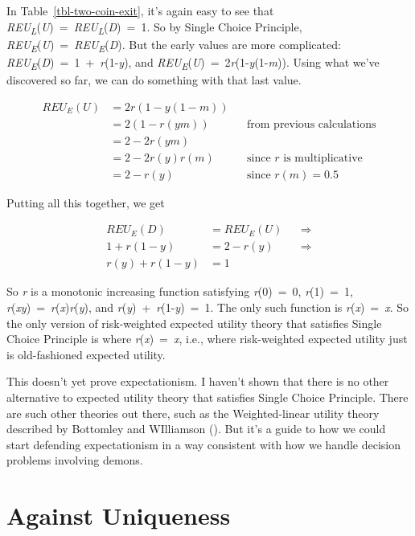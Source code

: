 \documentclass[
  12pt,
  letterpaper,
  DIV=11,
  numbers=noendperiod]{scrreprt}
\begin{document}
In Table~\ref{tbl-two-coin-exit}, it's again easy to see that
\emph{REU\textsubscript{L}}(\emph{U})~=~\emph{REU\textsubscript{L}}(\emph{D})~=~1.
So by Single Choice Principle,
\emph{REU\textsubscript{E}}(\emph{U})~=~\emph{REU\textsubscript{E}}(\emph{D}).
But the early values are more complicated:
\emph{REU\textsubscript{E}}(\emph{D})~=~1~+~\emph{r}(1-\emph{y}), and
\emph{REU\textsubscript{E}}(\emph{U})~=~2\emph{r}(1-\emph{y}(1-\emph{m})).
Using what we've discovered so far, we can do something with that last
value.

\begin{align*}
REU_E(U) &= 2r(1-y(1-m)) \\
  &= 2(1-r(ym))  && \text{from previous calculations} \\
  &= 2 - 2r(ym) \\
  &= 2 - 2r(y)r(m) && \text{since $r$ is multiplicative} \\
  &= 2 - r(y)  && \text{since $r(m) = 0.5$}
\end{align*}

Putting all this together, we get

\begin{align*}
REU_E(D) &= REU_E(U)  && \Rightarrow \\
1 + r(1-y) &= 2 - r(y) && \Rightarrow \\
r(y) + r(1-y) &= 1
\end{align*}

So \emph{r} is a monotonic increasing function satisfying
\emph{r}(0)~=~0, \emph{r}(1)~=~1,
\emph{r}(\emph{xy})~=~\emph{r}(\emph{x})\emph{r}(\emph{y}), and
\emph{r}(\emph{y})~+~\emph{r}(1-\emph{y})~=~1. The only such function is
\emph{r}(\emph{x})~=~\emph{x}. So the only version of risk-weighted
expected utility theory that satisfies Single Choice Principle is where
\emph{r}(\emph{x})~=~\emph{x}, i.e., where risk-weighted expected
utility just is old-fashioned expected utility.

This doesn't yet prove expectationism. I haven't shown that there is no
other alternative to expected utility theory that satisfies Single
Choice Principle. There are such other theories out there, such as the
Weighted-linear utility theory described by Bottomley and WIlliamson
(). But it's a guide to how we
could start defending expectationism in a way consistent with how we
handle decision problems involving demons.

\chapter{Against Uniqueness}\label{sec-unique}
\end{document}
